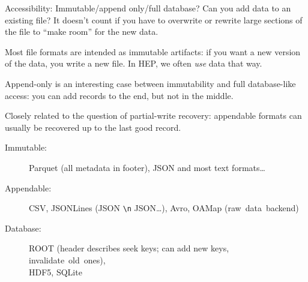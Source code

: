\documentclass[aspectratio=169]{beamer}
\begin{document}
\begin{frame}{Accessibility: Immutable/append only/full database?}
\vspace{0.5 cm}
Can you add data to an existing file? It doesn't count if you have to overwrite or rewrite large sections of the file to ``make room'' for the new data.

\vspace{0.35 cm}

Most file formats are intended as immutable artifacts: if you want a new version of the data, you write a new file. In HEP, we often {\it use} data that way.

\vspace{0.35 cm}

Append-only is an interesting case between immutability and full database-like access: you can add records to the end, but not in the middle.

\vspace{0.35 cm}

Closely related to the question of partial-write recovery: appendable formats can usually be recovered up to the last good record.

\vspace{0.15 cm}

\begin{description}
\item[Immutable:] Parquet (all metadata in footer), JSON and most text formats\ldots
\item[Appendable:] CSV, JSONLines (JSON {\tt\small \textbackslash n} JSON\ldots), Avro, OAMap \mbox{(raw data backend)\hspace{-1 cm}}
\item[Database:] ROOT (header describes seek keys; can add new keys, \mbox{invalidate old ones),\hspace{-1 cm}} \\ HDF5, SQLite
\end{description}
\end{frame}
\end{document}

